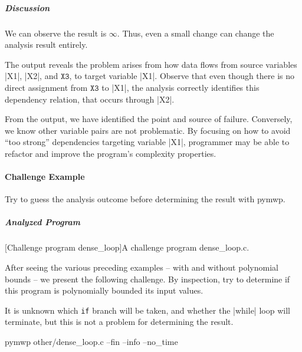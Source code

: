 \subparagraph*{Discussion}

We can observe the result is \(\infty\).
Thus, even a small change can change the analysis result entirely.

The output reveals the problem arises from how data flows from source variables \pr|X1|, \pr|X2|, and \(\texttt{X3}\), to target variable \pr|X1|.
Observe that even though there is no direct assignment from \(\texttt{X3}\) to \pr|X1|, the analysis correctly identifies this dependency relation, that occurs through \pr|X2|.

From the output, we have identified the point and source of failure.
Conversely, we know other variable pairs are not problematic.
By focusing on how to avoid \enquote{too strong} dependencies targeting variable \pr|X1|, programmer may be able to refactor and improve the program's complexity properties.

\paragraph{Challenge Example}\label{challenge-example}
Try to guess the analysis outcome before determining the result with pymwp.

\subparagraph*{Analyzed Program}

\begin{center}
\begin{minipage}{\textwidth}
\captionsetup{type=lstlisting}
[Challenge program dense\_loop]{A challenge program dense\_loop.c.}
\label{lst:challange}
\end{minipage}
\end{center}

After seeing the various preceding examples -- with and without polynomial bounds -- we present the following challenge.
By inspection, try to determine if this program is polynomially bounded \wrt its input values.

It is unknown which \texttt{if} branch will be taken, and whether the \pr|while| loop will terminate, but this is not a problem for determining the result.

\begin{center}
\begin{minipage}{\textwidth}
\begin{cmdlisting}[label={lst:ex5-run-cmd}]
pymwp other/dense_loop.c --fin --info --no_time
\end{cmdlisting}
\end{minipage}
\end{center}

